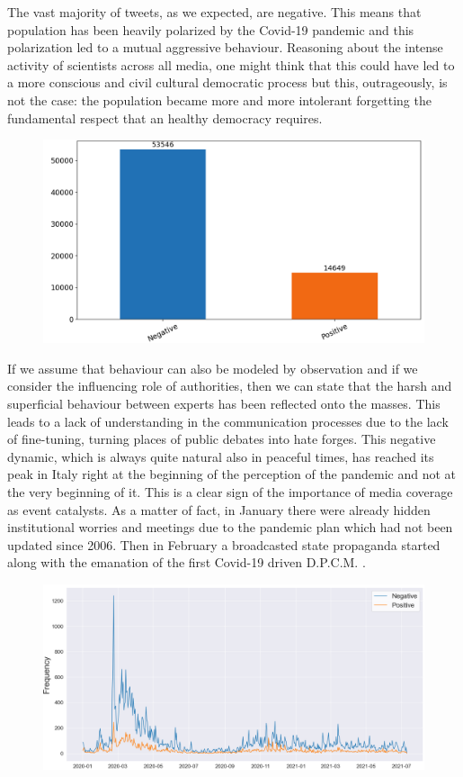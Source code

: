 \documentclass[sigchi]{acmart}
\begin{document}
The vast majority of tweets, as we expected, are negative. This means that population has been heavily polarized by the Covid-19 pandemic and this polarization led to a mutual aggressive behaviour. Reasoning about the intense activity of scientists across all media, one might think that this could have led to a more conscious and civil cultural democratic process but this, outrageously, is not the case: the population became more and more intolerant forgetting the fundamental respect that an healthy democracy requires.
\begin{figure}[htbp!]
  \includegraphics[width=.5\linewidth]{img/Results/SentimentAnalysis_histVal.png}
\end{figure}
If we assume that behaviour can also be modeled by observation and if we consider the influencing role of authorities, then we can state that the harsh and superficial behaviour between experts has been reflected onto the masses. This leads to a lack of understanding in the communication processes due to the lack of fine-tuning, turning places of public debates into hate forges. This negative dynamic, which is always quite natural also in peaceful times, has reached its peak in Italy right at the beginning of the perception of the pandemic and not at the very beginning of it. This is a clear sign of the importance of media coverage as event catalysts. As a matter of fact, in January there were already hidden institutional worries and meetings due to the pandemic plan which had not been updated since 2006. Then in February a broadcasted state propaganda started along with the emanation of the first Covid-19 driven D.P.C.M. .
\begin{figure}[htbp!]
\centering
\includegraphics[width=.45\textwidth]{img/Results/SentimentAnalysis_line.png}
\end{figure}
\end{document}
